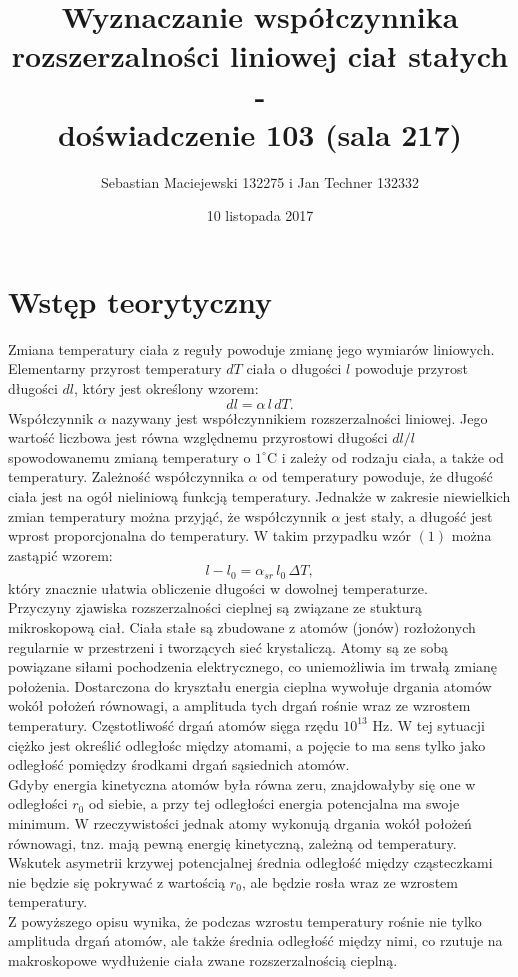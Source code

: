 \documentclass[10pt,a4paper]{article}
\author{Sebastian Maciejewski 132275 i Jan Techner 132332}
\title{Wyznaczanie współczynnika rozszerzalności liniowej ciał stałych - \\ doświadczenie 103 (sala 217)}
\date{10 listopada 2017}
\newcommand{\forceindent}{\leavevmode{\parindent=3em\indent}}
\begin{document}
\maketitle
\section{Wstęp teorytyczny}
\forceindent Zmiana temperatury ciała z reguły powoduje zmianę jego wymiarów liniowych. Elementarny przyrost temperatury $dT$ ciała o długości $l$ powoduje przyrost długości $dl$, który jest określony wzorem: 
\begin{equation}
dl = \alpha \, l \, dT.
\end{equation}
\forceindent Współczynnik $\alpha$ nazywany jest współczynnikiem rozszerzalności liniowej. Jego wartość liczbowa jest równa względnemu przyrostowi długości $dl/l$ spowodowanemu zmianą temperatury o $1^{\circ}$C i zależy od rodzaju ciała, a także od temperatury. Zależność współczynnika $\alpha$ od temperatury powoduje, że długość ciała jest na ogół nieliniową funkcją temperatury. Jednakże w zakresie niewielkich zmian temperatury można przyjąć, że współczynnik $\alpha$ jest stały, a długość jest wprost proporcjonalna do temperatury. W takim przypadku wzór $(1)$ można zastąpić wzorem: 
\begin{equation}
l - l_{0} = \alpha_{sr} \, l_{0} \, \Delta T,
\end{equation}
który znacznie ułatwia obliczenie długości w dowolnej temperaturze. \\ \newline
\forceindent Przyczyny zjawiska rozszerzalności cieplnej są związane ze stukturą mikroskopową ciał. Ciała stałe są zbudowane z atomów (jonów) rozłożonych regularnie w przestrzeni i tworzących sieć krystaliczą. Atomy są ze sobą powiązane siłami pochodzenia elektrycznego, co uniemożliwia im trwałą zmianę położenia. Dostarczona do kryształu energia cieplna wywołuje drgania atomów wokół położeń równowagi, a amplituda tych drgań rośnie wraz ze wzrostem temperatury. Częstotliwość drgań atomów sięga rzędu $10^{13}$ Hz. W tej sytuacji ciężko jest określić odległośc między atomami, a pojęcie to ma sens tylko jako odległość pomiędzy środkami drgań sąsiednich atomów. \\ \newline
\forceindent Gdyby energia kinetyczna atomów była równa zeru, znajdowałyby się one w odległości $r_0$ od siebie, a przy tej odległości energia potencjalna ma swoje minimum. W rzeczywistości jednak atomy wykonują drgania wokół położeń równowagi, tnz. mają pewną energię kinetyczną, zależną od temperatury. Wskutek asymetrii krzywej potencjalnej średnia odległość między cząsteczkami nie będzie się pokrywać z wartością $r_0$, ale będzie rosła wraz ze wzrostem temperatury. \\ \newline
\forceindent Z powyższego opisu wynika, że podczas wzrostu temperatury rośnie nie tylko amplituda drgań atomów, ale także średnia odległość między nimi, co rzutuje na makroskopowe wydłużenie ciała zwane rozszerzalnością cieplną.  
\end{document}
